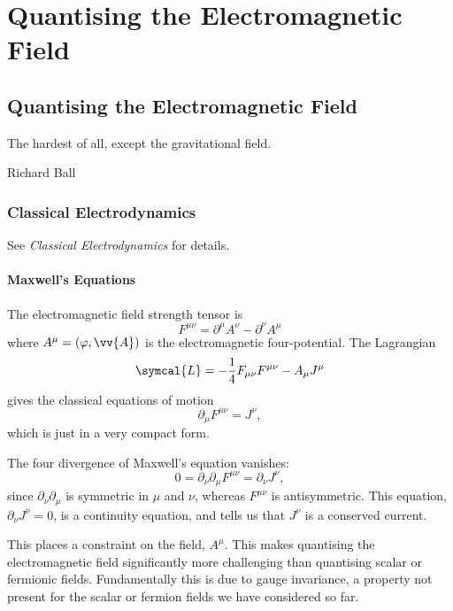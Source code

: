 \documentclass[fleqn]{NotesClass}
\newcommand*{\course}[1]{\textit{#1}}
\newcommand{\lagrangianDensity}{\symcal{L}}
\begin{document}
    \part{Quantising the Electromagnetic Field}
    \chapter{Quantising the Electromagnetic Field}
    \epigraph{The hardest of all, except the gravitational field.}{Richard Ball}
    \section{Classical Electrodynamics}
    \begin{rmk}
        See \course{Classical Electrodynamics} for details.
    \end{rmk}
    \subsection{Maxwell's Equations}
    The electromagnetic field strength tensor is
    \begin{equation}
        F^{\mu\nu} = \partial^\mu A^\nu - \partial^\nu A^\mu
    \end{equation}
    where \(A^\mu = (\varphi, \vv{A})\) is the electromagnetic four-potential.
    The Lagrangian
    \begin{equation}
        \lagrangianDensity = -\frac{1}{4} F_{\mu\nu}F^{\mu\nu} - A_\mu J^\mu
    \end{equation}
    gives the classical equations of motion
    \begin{equation}
        \partial_\mu F^{\mu\nu} = J^\nu,
    \end{equation}
    which is just  in a very compact form.
    
    The four divergence of Maxwell's equation vanishes:
    \begin{equation}
        0 = \partial_\nu \partial_\mu F^{\mu\nu} = \partial_\nu J^\nu,
    \end{equation}
    since \(\partial_\nu \partial_\mu\) is symmetric in \(\mu\) and \(\nu\), whereas \(F^{\mu\nu}\) is antisymmetric.
    This equation, \(\partial_\nu J^\nu = 0\), is a continuity equation, and tells us that \(J^\nu\) is a conserved current.
    
    This places a constraint on the field, \(A^\mu\).
    This makes quantising the electromagnetic field significantly more challenging than quantising scalar or fermionic fields.
    Fundamentally this is due to gauge invariance, a property not present for the scalar or fermion fields we have considered so far.
    
\end{document}
